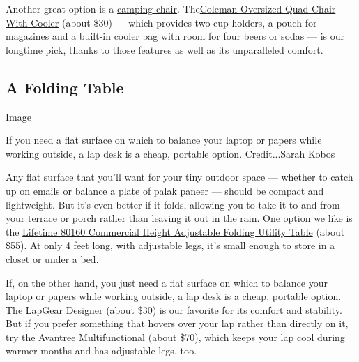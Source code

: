 Another great option is a
\href{https://www.nytimes.com/wirecutter/reviews/best-portable-outdoor-chairs/?utm_source=nytimes\&utm_medium=referral\&utm_campaign=outdoor-space}{camping
chair}.
The\href{https://www.nytimes.com/wirecutter/reviews/best-portable-outdoor-chairs/?utm_source=nytimes\&utm_medium=referral\&utm_campaign=outdoor-space\#our-pick-coleman-oversized-quad-chair-with-cooler}{Coleman
Oversized Quad Chair With Cooler} (about \$30) --- which provides two
cup holders, a pouch for magazines and a built-in cooler bag with room
for four beers or sodas --- is our longtime pick, thanks to those
features as well as its unparalleled comfort.

\hypertarget{a-folding-table}{%
\subsection{A Folding Table}\label{a-folding-table}}

Image

If you need a flat surface on which to balance your laptop or papers
while working outside, a lap desk is a cheap, portable option.
Credit...Sarah Kobos

Any flat surface that you'll want for your tiny outdoor space ---
whether to catch up on emails or balance a plate of palak paneer ---
should be compact and lightweight. But it's even better if it folds,
allowing you to take it to and from your terrace or porch rather than
leaving it out in the rain. One option we like is the
\href{https://www.nytimes.com/wirecutter/reviews/best-folding-tables/?utm_source=nytimes\&utm_medium=referral\&utm_campaign=outdoor-space\#a-small-table-for-kids-or-crafts-lifetime-commercial-height-adjustable-folding-utility-table}{Lifetime
80160 Commercial Height Adjustable Folding Utility Table} (about \$55).
At only 4 feet long, with adjustable legs, it's small enough to store in
a closet or under a bed.

If, on the other hand, you just need a flat surface on which to balance
your laptop or papers while working outside, a
\href{https://www.nytimes.com/wirecutter/reviews/best-lap-desk/?utm_source=nytimes\&utm_medium=referral\&utm_campaign=outdoor-space}{lap
desk is a cheap, portable option}. The
\href{https://www.nytimes.com/wirecutter/reviews/best-lap-desk/?utm_source=nytimes\&utm_medium=referral\&utm_campaign=outdoor-space\#our-pick-lapgear-designer}{LapGear
Designer} (about \$30) is our favorite for its comfort and stability.
But if you prefer something that hovers over your lap rather than
directly on it, try the
\href{https://www.nytimes.com/wirecutter/reviews/best-lap-desk/?utm_source=nytimes\&utm_medium=referral\&utm_campaign=outdoor-space\#also-great-avantree-multifunctional}{Avantree
Multifunctional} (about \$70), which keeps your lap cool during warmer
months and has adjustable legs, too.

